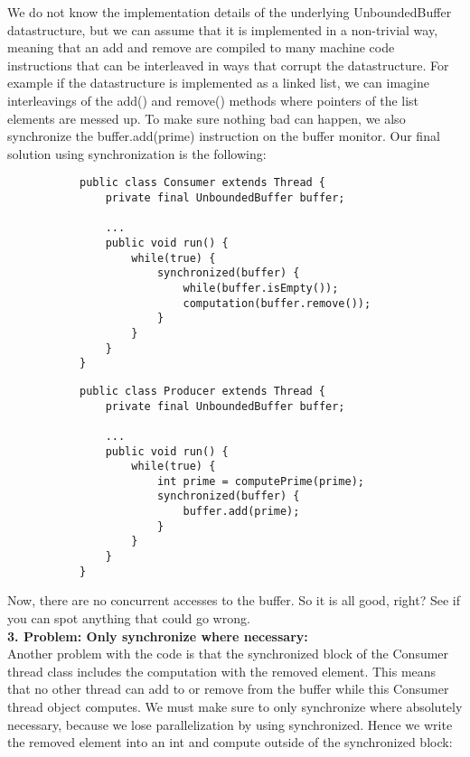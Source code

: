 \documentclass[main.tex]{subfiles}
\begin{document}
We do not know the implementation details of the underlying UnboundedBuffer datastructure, but we can assume that it is implemented in a non-trivial way, meaning that an add and remove are compiled to many machine code instructions that can be interleaved in ways that corrupt the datastructure. For example if the datastructure is implemented as a linked list, we can imagine interleavings of the add() and remove() methods where pointers of the list elements are messed up. To make sure nothing bad can happen, we also synchronize the buffer.add(prime) instruction on the buffer monitor. Our final solution using synchronization is the following:
\begin{figure}[H]
    \begin{subfigure}{.52\textwidth}
        \begin{verbatim}
public class Consumer extends Thread {
    private final UnboundedBuffer buffer;

    ...
    public void run() {
        while(true) {
            synchronized(buffer) {
                while(buffer.isEmpty());
                computation(buffer.remove());
            }
        }
    }
}
        \end{verbatim}
    \end{subfigure}%
    \begin{subfigure}{.52\textwidth}
        \begin{verbatim}
public class Producer extends Thread {
    private final UnboundedBuffer buffer;

    ...
    public void run() {
        while(true) {
            int prime = computePrime(prime);
            synchronized(buffer) {
                buffer.add(prime);
            }
        }
    }
}
        \end{verbatim}
    \end{subfigure}
\end{figure}
Now, there are no concurrent accesses to the buffer. So it is all good, right? See if you can spot anything that could go wrong.\\[3mm]
\textbf{3. Problem: Only synchronize where necessary:}\\
Another problem with the code is that the synchronized block of the Consumer thread class includes the computation with the removed element. This means that no other thread can add to or remove from the buffer while this Consumer thread object computes. We must make sure to only synchronize where absolutely necessary, because we lose parallelization by using synchronized. Hence we write the removed element into an int and compute outside of the synchronized block:
\end{document}
